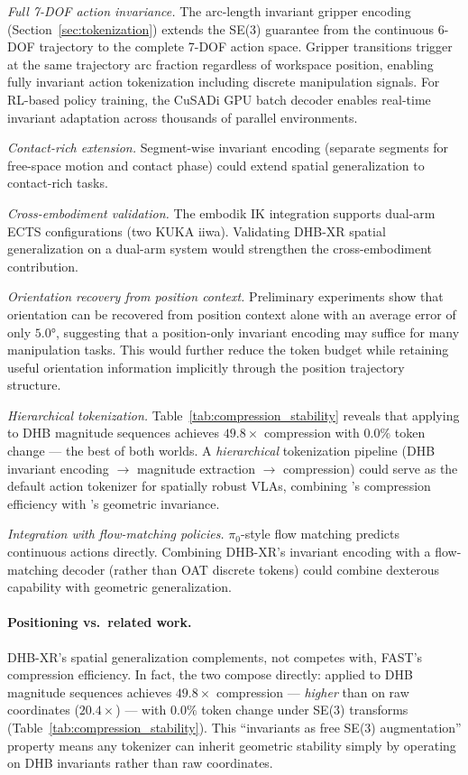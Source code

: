 \emph{Full 7-DOF action invariance.}
The arc-length invariant gripper encoding (Section~\ref{sec:tokenization})
extends the SE(3) guarantee from the continuous 6-DOF trajectory to the
complete 7-DOF action space.
Gripper transitions trigger at the same trajectory arc fraction
regardless of workspace position, enabling fully invariant action
tokenization including discrete manipulation signals.
For RL-based policy training, the CuSADi GPU batch decoder enables
real-time invariant adaptation across thousands of parallel environments.

\emph{Contact-rich extension.}
Segment-wise invariant encoding (separate segments for free-space motion and
contact phase) could extend spatial generalization to contact-rich tasks.

\emph{Cross-embodiment validation.}
The embodik IK integration supports dual-arm ECTS configurations (two KUKA iiwa).
Validating DHB-XR spatial generalization on a dual-arm system would strengthen
the cross-embodiment contribution.

\emph{Orientation recovery from position context.}
Preliminary experiments show that orientation can be recovered from position
context alone with an average error of only $5.0°$, suggesting that a
position-only invariant encoding may suffice for many manipulation tasks.
This would further reduce the token budget while retaining useful orientation
information implicitly through the position trajectory structure.

\emph{Hierarchical tokenization.}
Table~\ref{tab:compression_stability} reveals that applying \fast{} to DHB
magnitude sequences achieves $49.8\times$ compression with $0.0\%$ token change
--- the best of both worlds.
A \emph{hierarchical} tokenization pipeline (DHB invariant encoding $\to$
magnitude extraction $\to$ \fast{} compression) could serve as the default
action tokenizer for spatially robust VLAs, combining \fast{}'s compression
efficiency with \dhb{}'s geometric invariance.

\emph{Integration with flow-matching policies.}
$\pi_0$-style flow matching predicts continuous actions directly.
Combining DHB-XR's invariant encoding with a flow-matching decoder
(rather than OAT discrete tokens) could combine dexterous capability with
geometric generalization.

\paragraph{Positioning vs.\ related work.}
DHB-XR's spatial generalization complements, not competes with, FAST's compression efficiency.
In fact, the two compose directly: \fast{} applied to DHB magnitude sequences achieves
$49.8\times$ compression --- \emph{higher} than \fast{} on raw coordinates ($20.4\times$) ---
with $0.0\%$ token change under SE(3) transforms (Table~\ref{tab:compression_stability}).
This ``invariants as free SE(3) augmentation'' property means any tokenizer can inherit
geometric stability simply by operating on DHB invariants rather than raw coordinates.

